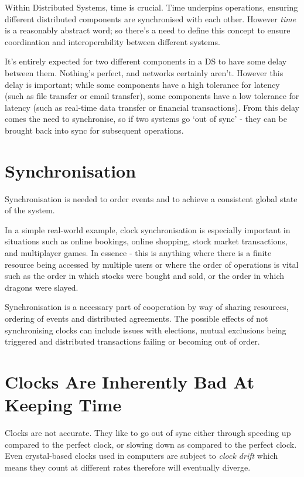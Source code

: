 
Within Distributed Systems, time is crucial. Time underpins operations, ensuring different distributed components are synchronised with each other. However \textit{time} is a reasonably abstract word; so there's a need to define this concept to ensure coordination and interoperability between different systems. 

It's entirely expected for two different components in a DS to have some delay between them. Nothing's perfect, and networks certainly aren't. However this delay is important; while some components have a high tolerance for latency (such as file transfer or email transfer), some components have a low tolerance for latency (such as real-time data transfer or financial transactions). From this delay comes the need to synchronise, so if two systems go `out of sync' - they can be brought back into sync for subsequent operations. 

\section{Synchronisation}
Synchronisation is needed to order events and to achieve a consistent global state of the system. 

In a simple real-world example, clock synchronisation is especially important in situations such as online bookings, online shopping, stock market transactions, and multiplayer games. In essence - this is anything where there is a finite resource being accessed by multiple users or where the order of operations is vital such as the order in which stocks were bought and sold, or the order in which dragons were slayed.

Synchronisation is a necessary part of cooperation by way of sharing resources, ordering of events and distributed agreements. The possible effects of not synchronising clocks can include issues with elections, mutual exclusions being triggered and distributed transactions failing or becoming out of order.

\section{Clocks Are Inherently Bad At Keeping Time}
Clocks are not accurate. They like to go out of sync either through speeding up compared to the perfect clock, or slowing down as compared to the perfect clock. Even crystal-based clocks used in computers are subject to \textit{clock drift} which means they count at different rates therefore will eventually diverge. 

